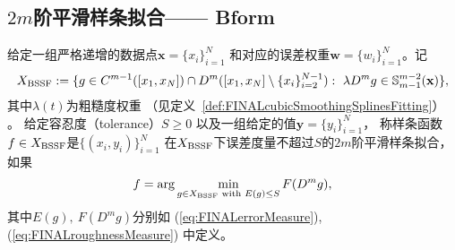 \subsection{$2m$阶平滑样条拟合—— Bform }
\label{sec:FINAL2mSmoothingSplinesFitting}

\begin{defn}[$2m$阶平滑样条拟合]
  \label{def:FINAL2mSmoothingSplinesFitting}
  给定一组严格递增的数据点$\mathbf{x}=\{x_{i}\}_{i=1}^{N}$
  和对应的误差权重$\mathbf{w}=\{w_{i}\}_{i=1}^{N}$。记
  \begin{equation}
    \label{eq:FINALSSFBFormSpace}
      X_{\textnormal{BSSF}}:=\{g\in C^{m-1}([x_{1},x_{N}])\cap
      D^{m}([x_{1},x_{N}]\setminus \{x_{i}\}_{i=2}^{N-1}):
  \ \lambda D^{m}g\in \mathbb{S}_{m-1}^{m-2}(\mathbf{x})\},
  \end{equation}
  其中$\lambda(t)$为粗糙度权重
  （见定义~\ref{def:FINALcubicSmoothingSplinesFitting}） 。
  给定容忍度（tolerance）$S\ge 0$
  以及一组给定的值$\mathbf{y}=\{y_{i}\}_{i=1}^{N}$，
  称样条函数$f\in X_{\textnormal{BSSF}}$是$\{(x_{i},y_{i})\}_{i=1}^{N}$
  在$ X_{\textnormal{BSSF}}$下误差度量不超过$S$的$2m$阶平滑样条拟合，
  如果
  \begin{equation}
    \label{eq:FINAL2mSmoothingSplinesFitting}
    f = \arg \min_{g\in  X_{\textnormal{BSSF}}\textnormal{ with } E(g)\le S} F(D^{m}g),
  \end{equation}
  其中$E(g),\ F(D^{m}g)$分别如
  (\ref{eq:FINALerrorMeasure}), (\ref{eq:FINALroughnessMeasure}) 中定义。
\end{defn}

